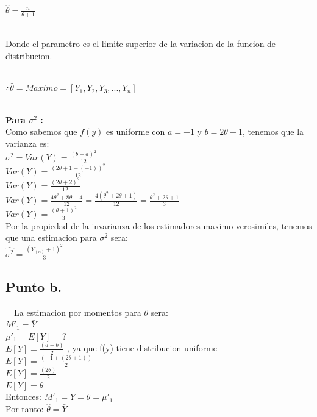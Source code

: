 \documentclass[letterpaper,12pt,onecolumn,titlepage]{article}
\begin{document}
~\\ $\hat{\theta} = \frac{n}{\theta+1}$

~\\ Donde el parametro es el limite superior de la variacion de la funcion de distribucion. 

~\\ $\therefore \hat{\theta} = Maximo = [Y_{1}, Y_{2}, Y_{3},...,Y_{n}]$ 

~\\ \textbf{Para $\sigma^{2}$ :}
~\\ Como sabemos que $f(y)$ es uniforme con $a=-1$ y $b=2\theta+1$, tenemos que la varianza es:
~\\ $\sigma^{2} = Var(Y) = \frac{(b-a)^2}{12}$
~\\ $Var(Y) = \frac{(2\theta+1-(-1))^2}{12}$
~\\ $Var(Y) = \frac{(2\theta+2)^2}{12}$
~\\ $Var(Y) = \frac{4\theta^2 +8\theta+4}{12}=\frac{4(\theta^2 +2\theta+1)}{12}=\frac{\theta^2 +2\theta+1}{3}$
~\\ $Var(Y) = \frac{(\theta+1)^2}{3}$
~\\ Por la propiedad de la invarianza de los estimadores maximo verosimiles, tenemos que una estimacion para $\sigma^2$ sera:
~\\ $\hat{\sigma^2}=\frac{(Y_{(n)}+1)^2}{3}$

\subsection{Punto b.}
~\ La estimacion por momentos para $\theta$ sera:
~\\ $M'_1=\bar{Y}$
~\\ $\mu'_1=E[Y]=?$
~\\ $E[Y]= \frac{(a+b)}{2}$  , ya que f(y) tiene distribucion uniforme
~\\ $E[Y]= \frac{(-1+(2\theta+1))}{2}$
~\\ $E[Y]= \frac{(2\theta)}{2}$
~\\ $E[Y]= \theta$
~\\ Entonces: $M'_1=\bar{Y}=\theta=\mu'_1$
~\\ Por tanto: $\hat{\theta}=\bar{Y}$


\end{document}
